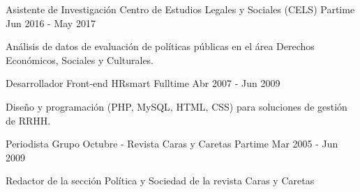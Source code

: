 \begin{cventries}
  \cventry%
    {Asistente de Investigación}%
    {Centro de Estudios Legales y Sociales (CELS)}%
    {Partime}%
    {Jun 2016 - May 2017}%
    {%
      \begin{cvitems}
        \item {Análisis de datos de evaluación de políticas públicas en el área Derechos Económicos, Sociales y Culturales.}
      \end{cvitems}%
    }

  \cventry%
    {Desarrollador Front-end}%
    {HRsmart}%
    {Fulltime}%
    {Abr 2007 - Jun 2009}%
    {%
      \begin{cvitems}
        \item {Diseño y programación (PHP, MySQL, HTML, CSS) para soluciones de gestión de RRHH.}
      \end{cvitems}%
    }

  \cventry%
    {Periodista}%
    {Grupo Octubre - Revista Caras y Caretas}%
    {Partime}%
    {Mar 2005 - Jun 2009}%
    {%
      \begin{cvitems}
        \item {Redactor de la sección Política y Sociedad de la revista Caras y Caretas}
      \end{cvitems}%
    }

\end{cventries}